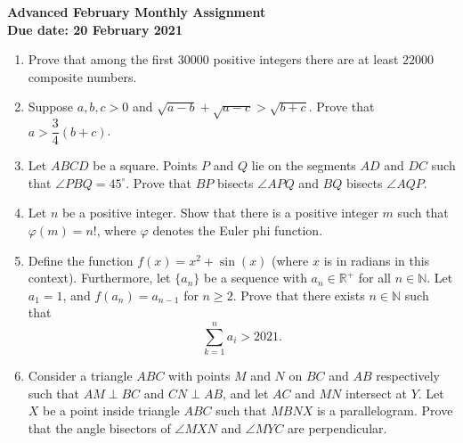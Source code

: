 \documentclass{article}
\begin{document}
\thispagestyle{empty}

\begin{center}
  \textbf{\Large Advanced February Monthly Assignment}
  \\ \vspace{1em}
  \textbf{\large Due date: 20 February 2021}
\end{center}

\vspace{12pt}

\begin{enumerate}[1.]

\vspace{24pt}
\item %
Prove that among the first $30000$ positive integers there are at least $22000$ composite numbers.


\vspace{24pt}
\item %
Suppose $a,b,c > 0$ and $\sqrt{a-b} +\sqrt{a-c} > \sqrt{b+c}$. Prove that $a > \dfrac{3}{4} (b+c)$.


\vspace{24pt}
\item %
Let $ABCD$ be a square.
Points $P$ and $Q$ lie on the segments $AD$ and $DC$ such that $\angle PBQ = 45^\circ$.
Prove that $BP$ bisects $\angle APQ$ and $BQ$ bisects $\angle AQP$.


\vspace{24pt}
\item %
Let $n$ be a positive integer. Show that there is a positive integer $m$ such that $\varphi(m) = n!$, where $\varphi$ denotes the Euler phi function.


\vspace{24pt}
\item %
Define the function $f(x) = x^2 + \sin(x)$ (where $x$ is in radians in this context). Furthermore, let $\{a_n\}$ be a sequence with $a_n \in \mathbb{R}^+$ for all $n \in \mathbb{N}$. Let $a_1 = 1$, and $f(a_n) = a_{n - 1}$ for $n \ge 2$. Prove that there exists $n \in \mathbb{N}$ such that 
$$\sum_{k = 1}^n a_i > 2021.$$


\vspace{24pt}
\item %
Consider a triangle $ABC$ with points $M$ and $N$ on $BC$ and $AB$ respectively such that $AM \perp BC$ and $CN \perp AB$, and let $AC$ and $MN$ intersect at $Y$.
Let $X$ be a point inside triangle $ABC$ such that $MBNX$ is a parallelogram.
Prove that the angle bisectors of $\angle MXN$ and $\angle MYC$ are perpendicular.


\end{enumerate}
\end{document}
